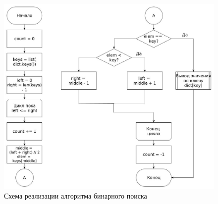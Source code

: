 \FloatBarrier
\begin{figure}[hp]
	\begin{center}
		\includegraphics[width=\linewidth]{graph/binary.jpg}
	\end{center}
	\caption{Схема реализации алгоритма бинарного поиска}
\end{figure}
\FloatBarrier

